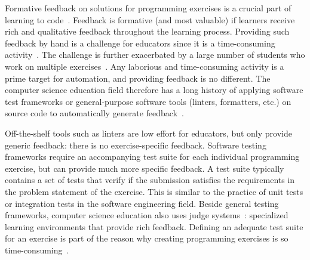 \documentclass[../main]{subfiles}
\begin{document}
Formative feedback on solutions for programming exercises is a crucial part of learning to code~\autocite{shuteFocusFormativeFeedback2008,orrellFeedbackLearningAchievement2006,luxton-reillyIntroductoryProgrammingSystematic2018}.
Feedback is formative (and most valuable) if learners receive rich and qualitative feedback throughout the learning process.
Providing such feedback by hand is a challenge for educators since it is a time-consuming activity~\autocite{camposMultinationalCaseStudy2012,cheangAutomatedGradingProgramming2003, keuningSystematicLiteratureReview2018,haoUnderstandingEffectiveDesign2021,zavalaUseSemanticBasedAIG2018,staubitzRepositoryOpenAutogradable2017,pirttinenCrowdsourcingProgrammingAssignments2018,gulwaniFeedbackGenerationPerformance2014,tangDataDrivenTestCase2016,edwardsDevelopingCommonFormat2008a}.
The challenge is further exacerbated by a large number of students who work on multiple exercises~\autocite{campGenerationCSGrowth2017,saxExaminingEnrollmentGrowth2017}.
Any laborious and time-consuming activity is a prime target for automation, and providing feedback is no different.
The computer science education field therefore has a long history of applying software test frameworks or general-purpose software tools (linters, formatters, etc.) on source code to automatically generate feedback~\autocite{haoUnderstandingEffectiveDesign2021,edwardsUsingSoftwareTesting2004,paivaAutomatedAssessmentComputer2022a,keuningSystematicLiteratureReview2018}.

Off-the-shelf tools such as linters are low effort for educators, but only provide generic feedback: there is no exercise-specific feedback.
Software testing frameworks require an accompanying test suite for each individual programming exercise, but can provide much more specific feedback.
A test suite typically contains a set of tests that verify if the submission satisfies the requirements in the problem statement of the exercise.
This is similar to the practice of unit tests or integration tests in the software engineering field.
Beside general testing frameworks, computer science education also uses judge systems~\autocite{paivaAutomatedAssessmentComputer2022a,wasikSurveyOnlineJudge2018}: specialized learning environments that provide rich feedback.
Defining an adequate test suite for an exercise is part of the reason why creating programming exercises is so time-consuming~\autocite{zavalaUseSemanticBasedAIG2018,staubitzRepositoryOpenAutogradable2017,queirosPexilProgrammingExercises2011,pirttinenCrowdsourcingProgrammingAssignments2018,gulwaniFeedbackGenerationPerformance2014,tangDataDrivenTestCase2016}.
\end{document}
